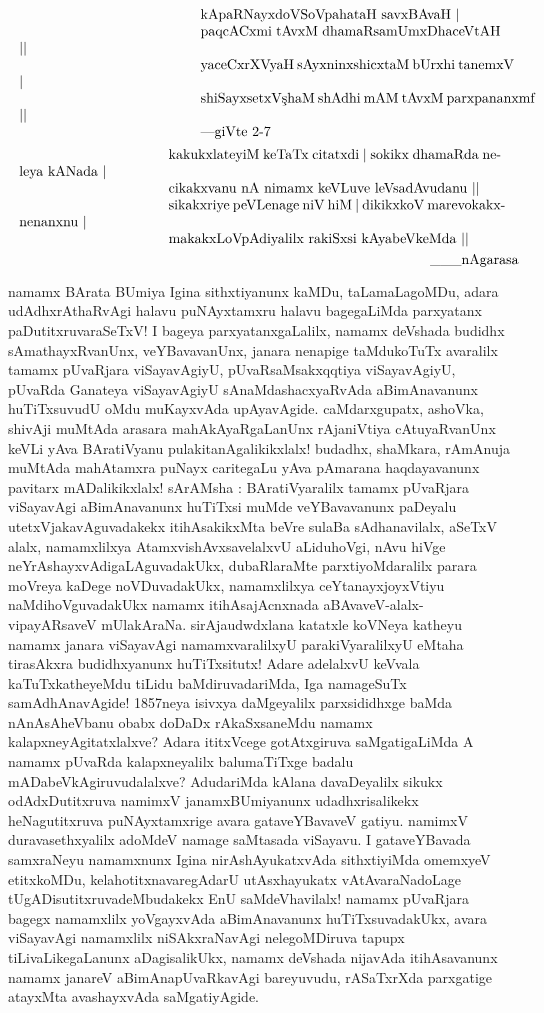 \documentclass[11pt,a4size]{article}
\begin{document}
$$
\vbox{\parskip=0pt\parindent=0pt \everypar{\hskip13em} \obeylines
kApaRNayxdoVSoVpahataH savxBAvaH |
paqcACxmi tAvxM dhamaRsamUmxDhaceVtAH ||
yaceCxrXVyaH sAyxninxshicxtaM bUrxhi tanemxV |
shiSayxsetxV{\char'263}haM shAdhi mAM tAvxM parxpananxmf ||\qquad ---giVte 2-7
}
$$
$$
\vbox{\parskip=0pt\parindent=0pt \everypar{\hskip10.7em} \obeylines
kakukxlateyiM keTaTx citatxdi | sokikx dhamaRda neleya kANada |
cikakxvanu nA nimamx keVLuve leVsadAvudanu ||
sikakxriye peVLenage niV hiM | dikikxkoV marevokakxnenanxnu |
makakxLoVpAdiyalilx rakiSxsi kAyabeVkeMda ||

\smallskip
\hspace{6.5cm} \_\_\_nAgarasa}
$$

namamx BArata BUmiya Igina sithxtiyanunx kaMDu, taLamaLagoMDu, adara
udAdhxrAthaRvAgi halavu puNAyxtamxru halavu bagegaLiMda parxyatanx
paDutitxruvaraSeTxV! I bageya parxyatanxgaLalilx, namamx deVshada
budidhx sAmathayxRvanUnx, veYBavavanUnx, janara nenapige taMdukoTuTx
avaralilx tamamx pUvaRjara viSayavAgiyU, pUvaRsaMsakxqqtiya
viSayavAgiyU, pUvaRda Ganateya viSayavAgiyU sAnaMdashacxyaRvAda
aBimAnavanunx huTiTxsuvudU oMdu muKayxvAda upAyavAgide. caMdarxgupatx,
ashoVka, shivAji muMtAda arasara mahAkAyaRgaLanUnx rAjaniVtiya
cAtuyaRvanUnx keVLi yAva BAratiVyanu pulakitanAgalikikxlalx! budadhx,
shaMkara, rAmAnuja muMtAda mahAtamxra puNayx caritegaLu yAva pAmarana
haqdayavanunx pavitarx mADalikikxlalx! sArAMsha : BAratiVyaralilx
tamamx pUvaRjara viSayavAgi aBimAnavanunx huTiTxsi muMde veYBavavanunx
paDeyalu utetxVjakavAguvadakekx itihAsakikxMta beVre sulaBa
sAdhanavilalx, aSeTxV alalx, namamxlilxya AtamxvishAvxsavelalxvU
aLiduhoVgi, nAvu hiVge neYrAshayxvAdigaLAguvadakUkx, dubaRlaraMte
parxtiyoMdaralilx parara moVreya kaDege noVDuvadakUkx, namamxlilxya
ceYtanayxjoyxVtiyu naMdihoVguvadakUkx namamx itihAsajAcnxnada
aBAvaveV-alalx\--vipayARsaveV mUlakAraNa. sirAja{u}dwdxlana katatxle
koVNeya katheyu namamx janara viSayavAgi namamxvaralilxyU
parakiVyaralilxyU eMtaha tirasAkxra budidhxyanunx huTiTxsitutx! Adare
adelalxvU keVvala kaTuTxkatheyeMdu tiLidu baMdiruvadariMda, Iga
namageSuTx samAdhAnavAgide! 1857neya isivxya daMgeyalilx parxsididhxge
baMda nAnAsAheVbanu obabx doDaDx rAkaSxsaneMdu namamx
kalapxneyAgitatxlalxve? Adara ititxVcege gotAtxgiruva saMgatigaLiMda A
namamx pUvaRda kalapxneyalilx balumaTiTxge badalu
mADabeVkAgiruvudalalxve? AdudariMda kAlana davaDeyalilx sikukx
odAdxDutitxruva namimxV janamxBUmiyanunx udadhxrisalikekx
heNagutitxruva puNAyxtamxrige avara gataveYBavaveV gatiyu. namimxV
duravasethxyalilx adoMdeV namage saMtasada viSayavu. I gataveYBavada
samxraNeyu namamxnunx Igina  nirAshAyukatxvAda sithxtiyiMda omemxyeV
etitxkoMDu, kelahotitxnavaregAdarU utAsxhayukatx vAtAvaraNadoLage
tUgADisutitxruvadeMbudakekx EnU saMdeVhavilalx! namamx pUvaRjara
bagegx namamxlilx yoVgayxvAda aBimAnavanunx huTiTxsuvadakUkx, avara
viSayavAgi namamxlilx niSAkxraNavAgi nelegoMDiruva tapupx
tiLivaLikegaLanunx aDagisalikUkx, namamx deVshada nijavAda
itihAsavanunx namamx janareV aBimAnapUvaRkavAgi bareyuvudu, rASaTxrXda
parxgatige atayxMta avashayxvAda saMgatiyAgide.
\end{document}
